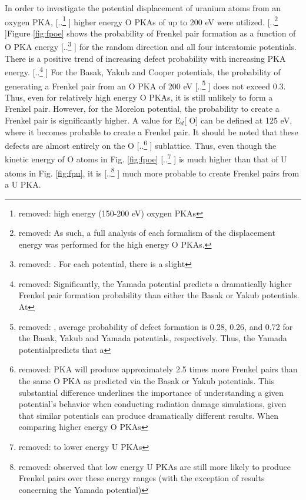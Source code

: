\documentclass[review]{elsarticle} %
\providecommand{\DIFaddtex}[1]{{\protect\color{blue} \sf #1}} %
\providecommand{\DIFdeltex}[1]{{\protect\color{red} [..\footnote{removed: #1} ]}} %
\providecommand{\DIFaddbegin}{} %
\providecommand{\DIFaddend}{} %
\providecommand{\DIFdelbegin}{} %
\providecommand{\DIFdelend}{} %
\providecommand{\DIFadd}[1]{\texorpdfstring{\DIFaddtex{#1}}{#1}} %
\providecommand{\DIFdel}[1]{\texorpdfstring{\DIFdeltex{#1}}{}} %
\newcommand{\DIFscaledelfig}{0.5}
\newlength{\DIFdelgraphicswidth} %
\newlength{\DIFdelgraphicsheight} %
\newcommand{\DIFaddincludegraphics}[2][]{{\color{blue}\fbox{\DIFOincludegraphics[#1]{#2}}}} %
\newcommand{\DIFdelincludegraphics}[2][]{%
\sbox{\DIFdelgraphicsbox}{\DIFOincludegraphics[#1]{#2}}%
\settoboxwidth{\DIFdelgraphicswidth}{\DIFdelgraphicsbox} %
\settoboxtotalheight{\DIFdelgraphicsheight}{\DIFdelgraphicsbox} %
\scalebox{\DIFscaledelfig}{%
\parbox[b]{\DIFdelgraphicswidth}{\usebox{\DIFdelgraphicsbox}\\[-\baselineskip] \rule{\DIFdelgraphicswidth}{0em}}\llap{\resizebox{\DIFdelgraphicswidth}{\DIFdelgraphicsheight}{%
\setlength{\unitlength}{\DIFdelgraphicswidth}%
\begin{picture}(1,1)%
\thicklines\linethickness{2pt} %
{\color[rgb]{1,0,0}\put(0,0){\framebox(1,1){}}}%
{\color[rgb]{1,0,0}\put(0,0){\line( 1,1){1}}}%
{\color[rgb]{1,0,0}\put(0,1){\line(1,-1){1}}}%
\end{picture}%
}\hspace*{3pt}}} %
} %
\DeclareRobustCommand{\DIFaddbegin}{\DIFOaddbegin \let\includegraphics\DIFaddincludegraphics} %
\DeclareRobustCommand{\DIFaddend}{\DIFOaddend \let\includegraphics\DIFOincludegraphics} %
\DeclareRobustCommand{\DIFdelbegin}{\DIFOdelbegin \let\includegraphics\DIFdelincludegraphics} %
\DeclareRobustCommand{\DIFdelend}{\DIFOaddend \let\includegraphics\DIFOincludegraphics} %
\begin{document}
\DIFdelend In order to investigate the \DIFaddbegin \DIFadd{potential }\DIFaddend displacement of uranium atoms from an oxygen PKA, \DIFdelbegin \DIFdel{high energy (150-200 eV) oxygen PKAs }\DIFdelend \DIFaddbegin \DIFadd{higher energy O PKAs of up to 200 eV }\DIFaddend were utilized. \DIFdelbegin \DIFdel{As such, a full analysis of each formalism of the displacement energy was performed for the high energy O PKAs. }\DIFdelend Figure \ref{fig:fpoe} shows the probability of Frenkel pair formation as a function of O PKA energy \DIFdelbegin \DIFdel{. For each potential, there is a slight }\DIFdelend \DIFaddbegin \DIFadd{for the random direction and all four interatomic potentials. There is a }\DIFaddend positive trend of increasing defect probability with increasing PKA energy. \DIFdelbegin \DIFdel{Significantly, the Yamada potential predicts a dramatically higher Frenkel pair formation probability than either the Basak or Yakub potentials. At }\DIFdelend \DIFaddbegin \DIFadd{For the Basak, Yakub and Cooper potentials, the probability of generating a Frenkel pair from an O PKA of }\DIFaddend 200 eV \DIFdelbegin \DIFdel{, average probability of defect formation is 0.28, 0.26, and 0.72 for the Basak, Yakub and Yamada potentials, respectively. Thus, the Yamada potentialpredicts that a }\DIFdelend \DIFaddbegin \DIFadd{does not exceed 0.3. Thus, even for relatively high energy O PKAs, it is still unlikely to form a Frenkel pair. However, for the Morelon potential, the probability to create a Frenkel pair is significantly higher. A value for E$_d$}[\DIFadd{O}] \DIFadd{can be defined at 125 eV, where it becomes probable to create a Frenkel pair. It should be noted that these defects are almost entirely on the }\DIFaddend O \DIFdelbegin \DIFdel{PKA will produce approximately 2.5 times more Frenkel pairs than the same O PKA as predicted via the Basak or Yakub potentials. This substantial difference underlines the importance of understanding a given potential's behavior when conducting radiation damage simulations, given that similar potentials can produce dramatically different results. When comparing higher energy O PKAs }\DIFdelend \DIFaddbegin \DIFadd{sublattice. Thus, even though the kinetic energy of O atoms }\DIFaddend in Fig. \ref{fig:fpoe} \DIFdelbegin \DIFdel{to lower energy U PKAs }\DIFdelend \DIFaddbegin \DIFadd{is much higher than that of U atoms }\DIFaddend in Fig. \ref{fig:fpu}, it is \DIFdelbegin \DIFdel{observed that low energy U PKAs are still more likely to produce Frenkel pairs over these energy ranges (with the exception of results concerning the Yamada potential)}\DIFdelend \DIFaddbegin \DIFadd{much more probable to create Frenkel pairs from a U PKA}\DIFaddend .
\end{document}
